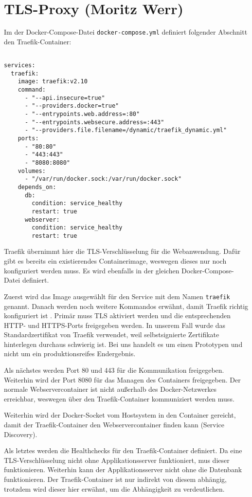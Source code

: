 \chapter{TLS-Proxy (Moritz Werr)}

Im der Docker-Compose-Datei  \lstinline|docker-compose.yml| definiert folgender Abschnitt den Traefik-Container:

\lstset{
	breaklines=true,         %
	breakatwhitespace=false, %
	basicstyle=\ttfamily,    %
}

\begin{lstlisting}[caption={\texttt{docker-compose.yml}},captionpos=b]
	
services:
  traefik:
    image: traefik:v2.10 
    command:
      - "--api.insecure=true"                        
      - "--providers.docker=true"                     
      - "--entrypoints.web.address=:80"
      - "--entrypoints.websecure.address=:443"  
      - "--providers.file.filename=/dynamic/traefik_dynamic.yml" 
    ports:
      - "80:80"                                       
      - "443:443"                                     
      - "8080:8080"                                   
    volumes:
      - "/var/run/docker.sock:/var/run/docker.sock"
    depends_on:
      db:
        condition: service_healthy
        restart: true
      webserver:
        condition: service_healthy
        restart: true

\end{lstlisting}

Traefik übernimmt hier die TLS-Verschlüsselung für die Webanwendung. Dafür gibt es bereits ein existierendes Containerimage, weswegen dieses nur noch konfiguriert werden muss. Es wird ebenfalls in der gleichen Docker-Compose-Datei definiert.

Zuerst wird das Image ausgewählt für den Service mit dem Namen \lstinline|traefik| genannt. Danach werden noch weitere Kommandos erwähnt, damit Traefik richtig konfiguriert ist . Primär muss TLS aktiviert werden und die entsprechenden HTTP- und HTTPS-Ports freigegeben werden. In unserem Fall wurde das Standardzertifikat von Traefik verwendet, weil selbstsignierte Zertifikate hinterlegen durchaus schwierig ist. Bei uns handelt es um einen Prototypen und nicht um ein produktionsreifes Endergebnis.

 Als nächstes werden Port 80 und 443 für die Kommunikation freigegeben. Weiterhin wird der Port 8080 für das Managen des Containers freigegeben. Der normale Webservercontainer ist nicht außerhalb des Docker-Netzwerkes erreichbar, weswegen über den Traefik-Container kommuniziert werden muss.

Weiterhin wird der Docker-Socket vom Hostsystem in den Container gereicht, damit der Traefik-Container den Webservercontainer finden kann (Service Discovery).

Als letztes werden die Healthchecks für den Traefik-Container definiert. Da eine TLS-Verschlüsselung nicht ohne Applikationsserver funktioniert, mus dieser funktionieren. Weiterhin kann der Applikationsserver nicht ohne die Datenbank funktionieren. Der Traefik-Container ist nur indirekt von diesem abhängig, trotzdem wird dieser hier erwähnt, um die Abhängigkeit zu verdeutlichen.